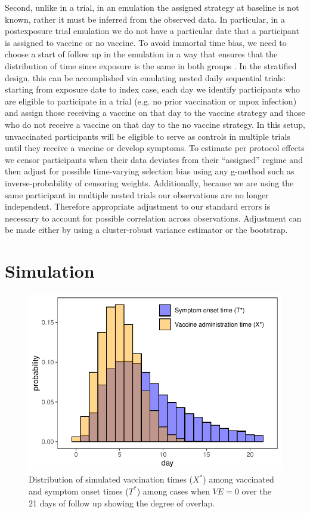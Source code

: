 \documentclass[11pt]{article}
\begin{document}
Second, unlike in a trial, in an emulation the assigned strategy at baseline is not known, rather it must be inferred from the observed data. In particular, in a postexposure trial emulation we do not have a particular date that a participant is assigned to vaccine or no vaccine. To avoid immortal time bias, we need to choose a start of follow up in the emulation in a way that ensures that the distribution of time since exposure is the same in both groups \cite{hernan2016specifying}. In the stratified design, this can be accomplished via emulating nested daily sequential trials: starting from exposure date to index case, each day we identify participants who are eligible to participate in a trial (e.g. no prior vaccination or mpox infection) and assign those receiving a vaccine on that day to the vaccine strategy and those who do not receive a vaccine on that day to the no vaccine strategy. In this setup, unvaccinated participants will be eligible to serve as controls in multiple trials until they receive a vaccine or develop symptoms. To estimate per protocol effects we censor participants when their data deviates from their ``assigned'' regime and then adjust for possible time-varying selection bias using any g-method such as inverse-probability of censoring weights. Additionally, because we are using the same participant in multiple nested trials our observations are no longer independent. Therefore appropriate adjustment to our standard errors is necessary to account for possible correlation across observations. Adjustment can be made either by using a cluster-robust variance estimator or the bootstrap.  

\section{Simulation}\label{sec:simulation}
\begin{figure}[t]
  \centering
  \includegraphics{../../../../3_figures/dist.pdf}
  \caption{Distribution of simulated vaccination times ($X^*$) among vaccinated and symptom onset times ($T^*$) among cases when $VE = 0$ over the 21 days of follow up showing the degree of overlap.}
  \label{fig:example_overlap}
\end{figure}
\end{document}
